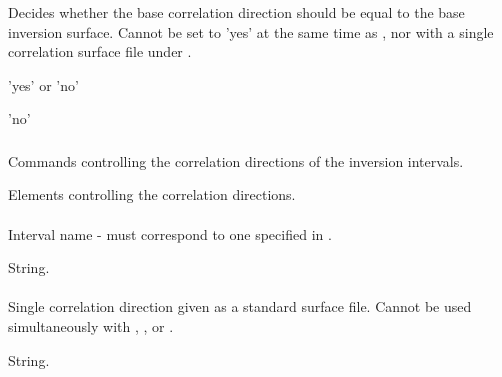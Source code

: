 \subsubsection{}
 \slist
   \item \Description Decides whether the base correlation direction should be equal to the base inversion surface. Cannot be set to 'yes' at the same time as , nor with a single correlation surface file under .
   \item \Argument 'yes' or 'no'
   \item \Default 'no'
 \elist
 
\subsubsection{}
 \slist
   \item \Description Commands controlling the correlation directions of the inversion intervals.
   \item \Argument Elements controlling the correlation directions.
   \item \Default
 \elist

\paragraph{}
 \slist
   \item \Description Interval name - must correspond to one specified in .
   \item \Argument String.
   \item \Default
 \elist

\paragraph{}
 \slist
   \item \Description Single correlation direction given as a standard surface file. Cannot be used simultaneously with , ,  or .
   \item \Argument String.
   \item \Default
 \elist

